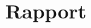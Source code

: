 \documentclass[12pt,a4paper,utf8x]{report}
\title{Rapport}
\begin{document}
\maketitle
\clearpage

\tableofcontents
\clearpage

\begin{onehalfspace}

\clearpage

\clearpage

\clearpage

\clearpage				

\clearpage

\clearpage
%

\end{onehalfspace}
\end{document}
